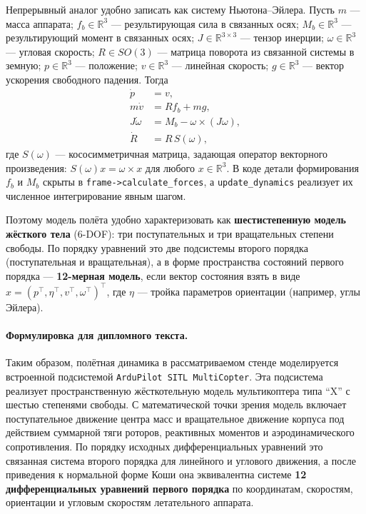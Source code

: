 \documentclass[12pt,a4paper]{article}
\begin{document}
Непрерывный аналог удобно записать как систему Ньютона--Эйлера. Пусть $m$ --- масса аппарата; $f_b \in \mathbb{R}^3$ --- результирующая сила в связанных осях; $M_b \in \mathbb{R}^3$ --- результирующий момент в связанных осях; $J \in \mathbb{R}^{3\times 3}$ --- тензор инерции; $\omega \in \mathbb{R}^3$ --- угловая скорость; $R \in SO(3)$ --- матрица поворота из связанной системы в земную; $p \in \mathbb{R}^3$ --- положение; $v \in \mathbb{R}^3$ --- линейная скорость; $g \in \mathbb{R}^3$ --- вектор ускорения свободного падения. Тогда
\begin{align}
  \dot{p} &= v, \\
  m \dot{v} &= R f_b + m g, \\
  J \dot{\omega} &= M_b - \omega \times (J \omega), \\
  \dot{R} &= R\,S(\omega),
\end{align}
где $S(\omega)$ --- кососимметричная матрица, задающая оператор векторного произведения: $S(\omega) x = \omega \times x$ для любого $x \in \mathbb{R}^3$. В коде детали формирования $f_b$ и $M_b$ скрыты в \texttt{frame->calculate\_forces}, а \texttt{update\_dynamics} реализует их численное интегрирование явным шагом.

Поэтому модель полёта удобно характеризовать как \textbf{шестистепенную модель жёсткого тела} (6-DOF): три поступательных и три вращательных степени свободы. По порядку уравнений это две подсистемы второго порядка (поступательная и вращательная), а в форме пространства состояний первого порядка --- \textbf{12-мерная модель}, если вектор состояния взять в виде $x = (p^\top, \eta^\top, v^\top, \omega^\top)^\top$, где $\eta$ --- тройка параметров ориентации (например, углы Эйлера).

\paragraph{Формулировка для дипломного текста.}
Таким образом, полётная динамика в рассматриваемом стенде моделируется встроенной подсистемой \texttt{ArduPilot SITL MultiCopter}. Эта подсистема реализует пространственную жёсткотельную модель мультикоптера типа ``X'' с шестью степенями свободы. С математической точки зрения модель включает поступательное движение центра масс и вращательное движение корпуса под действием суммарной тяги роторов, реактивных моментов и аэродинамического сопротивления. По порядку исходных дифференциальных уравнений это связанная система второго порядка для линейного и углового движения, а после приведения к нормальной форме Коши она эквивалентна системе \textbf{12 дифференциальных уравнений первого порядка} по координатам, скоростям, ориентации и угловым скоростям летательного аппарата.
\end{document}
